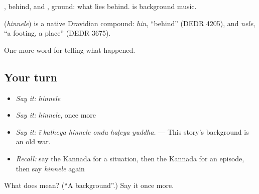 , behind, and , ground: what lies behind.   is background music.

\begin{cousinweb}
\textbf{} (\emph{hinnele}) is a native Dravidian compound: \emph{hin}, \textquotedblleft{}behind\textquotedblright{} (DEDR 4205), and \emph{nele}, \textquotedblleft{}a footing, a place\textquotedblright{} (DEDR 3675).
\end{cousinweb}

\begin{grammarlens}[title={What you've built}]
One more word for telling what happened.
\end{grammarlens}

\subsection*{Your turn}
\begin{itemize}
\raggedright
  \item \emph{Say it:} \emph{hinnele}
  \item \emph{Say it:} \emph{hinnele}, once more
  \item \emph{Say it:} \emph{ī katheya hinnele ondu haḷeya yuddha.} — This story's background is an old war.
  \item \emph{Recall:} say the Kannada for a situation, then the Kannada for an episode, then say \emph{hinnele} again
\end{itemize}

\begin{tcolorbox}[breakable,colback=teal!4,colframe=teal!35!black,title={Before you move on}]
What does  mean? (\textquotedblleft{}A background\textquotedblright{}.) Say it once more.
\end{tcolorbox}

